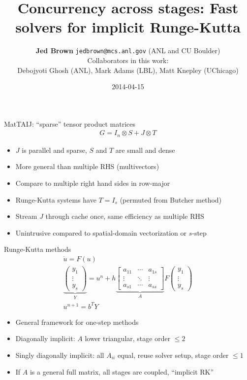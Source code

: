 \documentclass{beamer}
\title{Concurrency across stages: Fast solvers for implicit Runge-Kutta}
\author{{\bf Jed Brown} \texttt{jedbrown@mcs.anl.gov} (ANL and CU Boulder) \\
  Collaborators in this work: \\
  \quad Debojyoti Ghosh (ANL), Mark Adams (LBL), Matt Knepley (UChicago)
}
\date{2014-04-15}
\begin{document}
\lstset{language=C}
\normalem

\begin{frame}{MatTAIJ: ``sparse'' tensor product matrices}
  \begin{gather*}
    G = I_n \otimes S + J \otimes T
  \end{gather*}
  \begin{itemize}
  \item $J$ is parallel and sparse, $S$ and $T$ are small and dense
  \item More general than multiple RHS (multivectors)
  \item Compare to multiple right hand sides in row-major
  \item Runge-Kutta systems have $T = I_s$ (permuted from Butcher method)
  \item Stream $J$ through cache once, same efficiency as multiple RHS
  \item Unintrusive compared to spatial-domain vectorization or $s$-step
  \end{itemize}
\end{frame}

\begin{frame}{Runge-Kutta methods}
  \begin{gather*}
    \dot u = F(u) \\
    \underbrace{
    \begin{pmatrix}
      y_1 \\
      \vdots \\
      y_s
    \end{pmatrix}}_Y =
    u^{n} + h
    \underbrace{
    \begin{bmatrix}
      a_{11} & \dotsb & a_{1s} \\
      \vdots & \ddots & \vdots \\
      a_{s1} & \dotsb & a_{ss}
    \end{bmatrix}}_A
    F
    \begin{pmatrix}
      y_1 \\
      \vdots \\
      y_s
    \end{pmatrix} \\
    u^{n+1} = b^T Y
  \end{gather*}
  \begin{itemize}
  \item General framework for one-step methods
  \item Diagonally implicit: $A$ lower triangular, stage order $\le 2$
  \item Singly diagonally implicit: all $A_{ii}$ equal, reuse solver setup, stage order $\le 1$
  \item If $A$ is a general full matrix, all stages are coupled, ``implicit RK''
  \end{itemize}
\end{frame}
\end{document}

